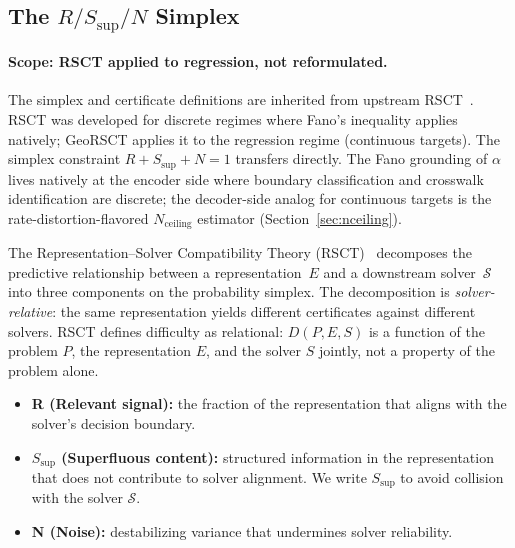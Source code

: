 \documentclass{article}
\begin{document}
\subsection{\texorpdfstring{The $R/S_{\text{sup}}/N$ Simplex}{The R/Ssup/N Simplex}}

\paragraph{Scope: RSCT applied to regression, not reformulated.} The simplex and certificate definitions are inherited from upstream RSCT~\citep{martin2026rsct}. RSCT was developed for discrete regimes where Fano's inequality applies natively; GeoRSCT applies it to the regression regime (continuous targets). The simplex constraint $R + S_{\text{sup}} + N = 1$ transfers directly. The Fano grounding of $\alpha$ lives natively at the encoder side where boundary classification and crosswalk identification are discrete; the decoder-side analog for continuous targets is the rate-distortion-flavored $N_{\text{ceiling}}$ estimator (Section~\ref{sec:nceiling}).

The Representation--Solver Compatibility Theory (RSCT)~\cite{martin2026rsct} decomposes the predictive relationship between a representation~$E$ and a downstream solver~$\mathcal{S}$ into three components on the probability simplex. The decomposition is \emph{solver-relative}: the same representation yields different certificates against different solvers. RSCT defines difficulty as relational: $D(P,E,S)$ is a function of the problem $P$, the representation $E$, and the solver $S$ jointly, not a property of the problem alone.

\begin{itemize}
\item \textbf{R (Relevant signal):} the fraction of the representation that aligns with the solver's decision boundary.
\item \textbf{$S_{\text{sup}}$ (Superfluous content):} structured information in the representation that does not contribute to solver alignment. We write $S_{\text{sup}}$ to avoid collision with the solver $\mathcal{S}$.
\item \textbf{N (Noise):} destabilizing variance that undermines solver reliability.
\end{itemize}
\end{document}
